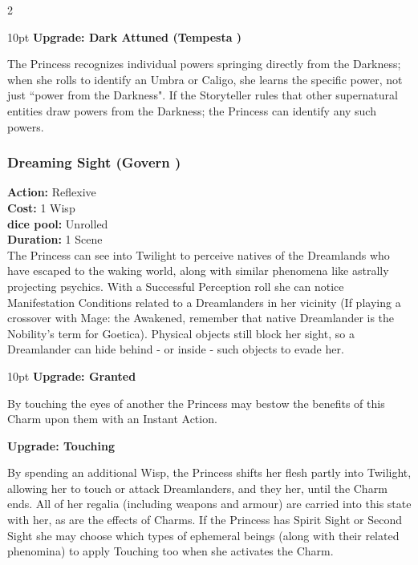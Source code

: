 \begin{multicols}{2}
\begin{myindentpar}{10pt}
\textbf{Upgrade: Dark Attuned (Tempesta \textbullet)}

The Princess recognizes individual powers springing directly from the Darkness; when she rolls to identify an Umbra or Caligo, she learns the specific power, not just \textquotedblleft power from the Darkness". If the Storyteller rules that other supernatural entities draw powers from the Darkness; the Princess can identify any such powers.\end{myindentpar}


\subsubsection*{Dreaming Sight (Govern \textbullet)}

\noindent \textbf{Action:} Reflexive\\ 

\noindent \textbf{Cost:} 1 Wisp\\ 

\noindent \textbf{dice pool:} Unrolled\\ 

\noindent \textbf{Duration:} 1 Scene\\ 

\noindent The Princess can see into Twilight to perceive natives of the Dreamlands who have escaped to the waking world, along with similar phenomena like astrally projecting psychics. With a Successful Perception roll she can notice Manifestation Conditions related to a Dreamlanders in her vicinity (If playing a crossover with Mage: the Awakened, remember that native Dreamlander is the Nobility's term for Goetica). Physical objects still block her sight, so a Dreamlander can hide behind - or inside - such objects to evade her.	

\begin{myindentpar}{10pt} \textbf{Upgrade: Granted}

By touching the eyes of another the Princess may bestow the benefits of this Charm upon them with an Instant Action. 

\textbf{Upgrade: Touching}
 
By spending an additional Wisp, the Princess shifts her flesh partly into Twilight, allowing her to touch or attack Dreamlanders, and they her, until the Charm ends. All of her regalia (including weapons and armour) are carried into this state with her, as are the effects of Charms. If the Princess has Spirit Sight or Second Sight she may choose which types of ephemeral beings (along with their related phenomina) to apply Touching too when she activates the Charm. 


\end{myindentpar}
\end{multicols}
